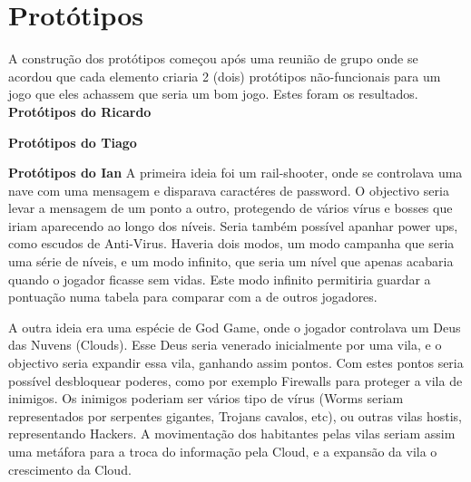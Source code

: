 \chapter{Protótipos}
\label{chap:proto}
A construção dos protótipos começou após uma reunião de grupo onde se acordou que cada elemento criaria 2 (dois) protótipos não-funcionais para um jogo que eles achassem que seria um bom jogo. Estes foram os resultados.
\newline
\textbf{Protótipos do Ricardo}


\newline
\textbf{Protótipos do Tiago}


\newline
\textbf{Protótipos do Ian}
A primeira ideia foi um rail-shooter, onde se controlava uma nave com uma mensagem e disparava caractéres de password. O objectivo seria levar a mensagem de um ponto a outro, protegendo de vários vírus e bosses que iriam aparecendo ao longo dos níveis. Seria também possível apanhar power ups, como escudos de Anti-Virus. Haveria dois modos, um modo campanha que seria uma série de níveis, e um modo infinito, que seria um nível que apenas acabaria quando o jogador ficasse sem vidas. Este modo infinito permitiria guardar a pontuação numa tabela para comparar com a de outros jogadores.

A outra ideia era uma espécie de God Game, onde o jogador controlava um Deus das Nuvens (Clouds). Esse Deus seria venerado inicialmente por uma vila, e o objectivo seria expandir essa vila, ganhando assim pontos. Com estes pontos seria possível desbloquear poderes, como por exemplo Firewalls para proteger a vila de inimigos. Os inimigos poderiam ser vários tipo de vírus (Worms seriam representados por serpentes gigantes, Trojans cavalos, etc), ou outras vilas hostis, representando Hackers. A movimentação dos habitantes pelas vilas seriam assim uma metáfora para a troca do informação pela Cloud, e a expansão da vila o crescimento da Cloud.
\newline